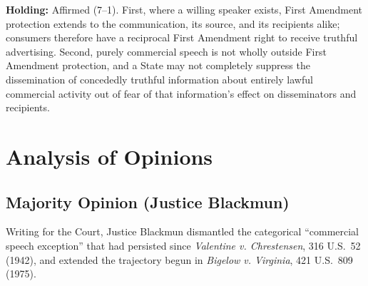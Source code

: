 \documentclass[12pt]{article}
\begin{document}
\textbf{Holding:} Affirmed (7--1). First, where a willing speaker exists, First Amendment protection extends to the communication, its source, and its recipients alike; consumers therefore have a reciprocal First Amendment right to receive truthful advertising. Second, purely commercial speech is not wholly outside First Amendment protection, and a State may not completely suppress the dissemination of concededly truthful information about entirely lawful commercial activity out of fear of that information's effect on disseminators and recipients.

\section{Analysis of Opinions}
\subsection{Majority Opinion (Justice Blackmun)}

Writing for the Court, Justice Blackmun dismantled the categorical ``commercial speech exception'' that had persisted since \textit{Valentine v. Chrestensen}, 316 U.S.\ 52 (1942), and extended the trajectory begun in \textit{Bigelow v. Virginia}, 421 U.S.\ 809 (1975).
\end{document}
